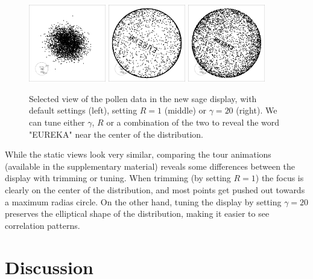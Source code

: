\documentclass[]{interact}
\theoremstyle{plain}%
\theoremstyle{definition}
\theoremstyle{remark}
\begin{document}
\begin{figure}
\centering
\includegraphics[width=0.3\textwidth]{../pngs/pollen_sage-088.png}
\includegraphics[width=0.3\textwidth]{../pngs/pollen_sage_R1-088.png}
\includegraphics[width=0.3\textwidth]{../pngs/pollen_sage_gam20-088.png}
\caption{Selected view of the pollen data in the new sage display, with default settings (left), setting $R=1$ (middle) or $\gamma=20$ (right). We can tune either $\gamma$, $R$ or a combination of the two to reveal the word "EUREKA" near the center of the distribution.}
\label{fig:pollen}
\end{figure}

While the static views look very similar, comparing the tour animations
(available in the supplementary material) reveals some differences
between the display with trimming or tuning. When trimming (by setting
\(R=1\)) the focus is clearly on the center of the distribution, and
most points get pushed out towards a maximum radias circle. On the other
hand, tuning the display by setting \(\gamma=20\) preserves the
elliptical shape of the distribution, making it easier to see
correlation patterns.

\hypertarget{sec:concl}{%
\section{Discussion}\label{sec:concl}}
\end{document}
